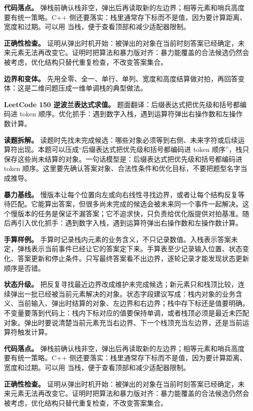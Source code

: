 \textbf{代码落点。} 弹栈前确认栈非空，弹出后再读取新的左边界；相等元素和哨兵高度要有统一策略。C++ 侧还要落实：栈里通常存下标而不是值，因为要计算距离、宽度和过期。可以用  当栈，便于查看顶部和减少适配器限制。

\textbf{正确性检查。} 证明从弹出时机开始：被弹出的对象在当前时刻答案已经确定，未来元素无法再改变它。证明时把算法和暴力版对齐：暴力能覆盖的合法候选仍然会被考虑，优化结构只替代重复检查，不改变答案集合。

\textbf{边界和变体。} 先用全零、全一、单行、单列、宽度和高度结算做对拍，再回答变体：这是二维问题压成一维单调栈的典型做法。

\noindent\textbf{LeetCode 150 逆波兰表达式求值。} 题面翻译：后缀表达式把优先级和括号都编码进 token 顺序。优化抓手：遇到数字入栈，遇到运算符弹出右操作数和左操作数计算。

\textbf{读题拆解。} 读题时先找未完成候选：哪些对象必须等到右侧、未来字符或后续运算符出现。本题可以压成“后缀表达式把优先级和括号都编码进 token 顺序”，栈只保存这些尚未结算的对象。一句话模型是：后缀表达式把优先级和括号都编码进 token 顺序。这里要先确认答案对象、合法性条件和优化目标，不要把题型名字当成推导。

\textbf{暴力基线。} 慢版本让每个位置向左或向右线性寻找边界，或者让每个结构反复等待匹配。它能算出答案，但很多尚未完成的候选会被未来同一个事件一起解决。这个慢版本的任务是保证不漏答案；它不追求快，只负责给优化版提供对拍基准。随后再引入优化抓手：遇到数字入栈，遇到运算符弹出右操作数和左操作数计算。

\textbf{手算样例。} 手算时记录栈内元素的业务含义，不只记录数值。入栈表示答案未定，弹栈表示当前事件已经让它的答案定下来。手算表至少记录输入位置、状态变化、答案更新和停止条件。只写最终答案看不出边界，逐轮记录才能发现状态更新顺序是否错。

\textbf{状态升级。} 把反复寻找最近边界改成维护未完成候选；新元素只和栈顶比较，连续弹出一批已经被当前元素解决的对象。状态字段建议写成：栈内对象的业务含义、当前输入、弹出时结算的对象、左边界和右边界；栈中存下标还是值要明确。不变量要落到代码上：栈内下标对应的值要保持单调，或者栈顶必须是最近未匹配对象。弹出时要说清楚当前元素充当右边界、下一个栈顶充当左边界，还是当前运算符触发计算。

\textbf{代码落点。} 弹栈前确认栈非空，弹出后再读取新的左边界；相等元素和哨兵高度要有统一策略。C++ 侧还要落实：栈里通常存下标而不是值，因为要计算距离、宽度和过期。可以用  当栈，便于查看顶部和减少适配器限制。

\textbf{正确性检查。} 证明从弹出时机开始：被弹出的对象在当前时刻答案已经确定，未来元素无法再改变它。证明时把算法和暴力版对齐：暴力能覆盖的合法候选仍然会被考虑，优化结构只替代重复检查，不改变答案集合。


